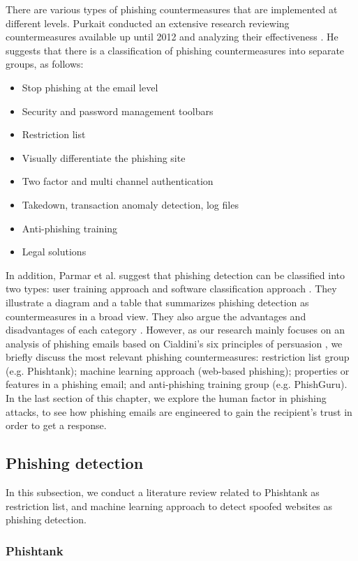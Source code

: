 There are various types of phishing countermeasures that are implemented
at different levels. Purkait conducted an extensive research reviewing
countermeasures available up until 2012 and analyzing their effectiveness
\citep{purkait}. He suggests that there is a classification of phishing
countermeasures into separate groups, as follows:
\begin{itemize}
\item Stop phishing at the email level
\item Security and password management toolbars
\item Restriction list
\item Visually differentiate the phishing site
\item Two factor and multi channel authentication
\item Takedown, transaction anomaly detection, log files
\item Anti-phishing training
\item Legal solutions
\end{itemize}
In addition, Parmar et al. suggest that phishing detection can be
classified into two types: user training approach and software classification
approach \citep{parmar:2014}. They illustrate a diagram and a table
that summarizes phishing detection as countermeasures in a broad view\citep{parmar:2014}.
They also argue the advantages and disadvantages of each category
\citep{parmar:2014}. However, as our research mainly focuses on an
analysis of phishing emails based on Cialdini's six principles of
persuasion \citep{cialdini:2001}, we briefly discuss the most relevant
phishing countermeasures: restriction list group (e.g. Phishtank);
machine learning approach (web-based phishing); properties or features
in a phishing email; and anti-phishing training group (e.g. PhishGuru).
In the last section of this chapter, we explore the human factor in
phishing attacks, to see how phishing emails are engineered to gain
the recipient's trust in order to get a response.


\subsection{Phishing detection}

In this subsection, we conduct a literature review related to Phishtank
as restriction list, and machine learning approach to detect spoofed
websites as phishing detection.


\subsubsection{Phishtank}

